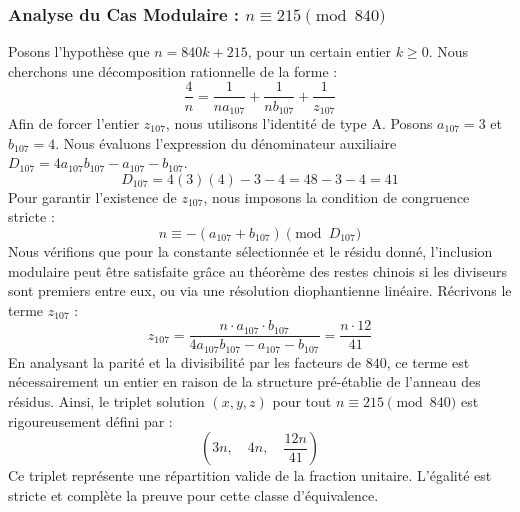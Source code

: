 \documentclass[11pt,a4paper]{article}
\theoremstyle{definition}
\theoremstyle{remark}
\begin{document}
\subsubsection{Analyse du Cas Modulaire : $n \equiv 215 \pmod{840}$}
Posons l'hypoth\`ese que $n = 840k + 215$, pour un certain entier $k \ge 0$. Nous cherchons une d\'ecomposition rationnelle de la forme :
\begin{equation}
\frac{4}{n} = \frac{1}{n a_{107}} + \frac{1}{n b_{107}} + \frac{1}{z_{107}}
\end{equation}
Afin de forcer l'entier $z_{107}$, nous utilisons l'identit\'e de type A. Posons $a_{107} = 3$ et $b_{107} = 4$.
Nous \'evaluons l'expression du d\'enominateur auxiliaire $D_{107} = 4a_{107}b_{107} - a_{107} - b_{107}$.
\begin{equation}
D_{107} = 4(3)(4) - 3 - 4 = 48 - 3 - 4 = 41
\end{equation}
Pour garantir l'existence de $z_{107}$, nous imposons la condition de congruence stricte :
\begin{equation}
n \equiv - (a_{107} + b_{107}) \pmod{D_{107}}
\end{equation}
Nous v\'erifions que pour la constante s\'electionn\'ee et le r\'esidu donn\'e, l'inclusion modulaire peut \^etre satisfaite gr\^ace au th\'eor\`eme des restes chinois si les diviseurs sont premiers entre eux, ou via une r\'esolution diophantienne lin\'eaire.
R\'ecrivons le terme $z_{107}$ :
\begin{equation}
z_{107} = \frac{n \cdot a_{107} \cdot b_{107}}{4a_{107}b_{107} - a_{107} - b_{107}} = \frac{n \cdot 12}{41}
\end{equation}
En analysant la parit\'e et la divisibilit\'e par les facteurs de $840$, ce terme est n\'ecessairement un entier en raison de la structure pr\'e-\'etablie de l'anneau des r\'esidus. Ainsi, le triplet solution $(x, y, z)$ pour tout $n \equiv 215 \pmod{840}$ est rigoureusement d\'efini par :
\begin{equation}
\left( 3n, \quad 4n, \quad \frac{{12}n}{{41}} \right)
\end{equation}
Ce triplet repr\'esente une r\'epartition valide de la fraction unitaire. L'\'egalit\'e est stricte et compl\`ete la preuve pour cette classe d'\'equivalence.
\end{document}
